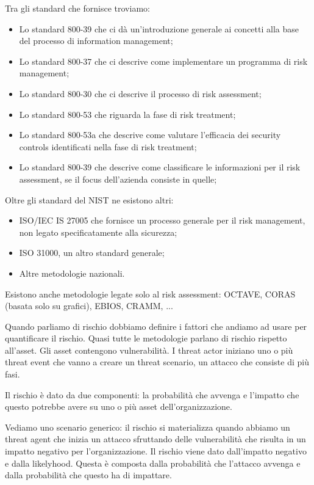 \noindent Tra gli standard che fornisce troviamo:
\begin{itemize}
    \item Lo standard 800-39 che ci dà un'introduzione generale ai concetti alla base del processo di information management;
    \item Lo standard 800-37 che ci descrive come implementare un programma di risk management;
    \item Lo standard 800-30 che ci descrive il processo di risk assessment;
    \item Lo standard 800-53 che riguarda la fase di risk treatment;
    \item Lo standard 800-53a che descrive come valutare l'efficacia dei security controls identificati nella fase di risk treatment;
    \item Lo standard 800-39 che descrive come classificare le informazioni per il risk assessment, se il focus dell'azienda consiste in quelle;
\end{itemize}

\noindent Oltre gli standard del NIST ne esistono altri:
\begin{itemize}
    \item ISO/IEC IS 27005 che fornisce un processo generale per il risk management, non legato specificatamente alla sicurezza;
    \item ISO 31000, un altro standard generale;
    \item Altre metodologie nazionali.
\end{itemize}

\noindent Esistono anche metodologie legate solo al risk assessment: OCTAVE, CORAS (basata solo su grafici),  EBIOS, CRAMM, ...


\noindent Quando parliamo di rischio dobbiamo definire i fattori che andiamo ad usare per quantificare il rischio. Quasi tutte le metodologie parlano di rischio rispetto all'asset. Gli asset contengono vulnerabilità. I threat actor iniziano uno o più threat event che vanno a creare un threat scenario, un attacco che consiste di più fasi. 

Il rischio è dato da due componenti: la probabilità che avvenga e l'impatto che questo potrebbe avere su uno o più asset dell'organizzazione. 

Vediamo uno scenario generico: il rischio si materializza quando abbiamo un threat agent che inizia un attacco sfruttando delle vulnerabilità che risulta in un impatto negativo per l'organizzazione. Il rischio viene dato dall'impatto negativo e dalla likelyhood. Questa è composta dalla probabilità che l'attacco avvenga e dalla probabilità che questo ha di impattare. 





